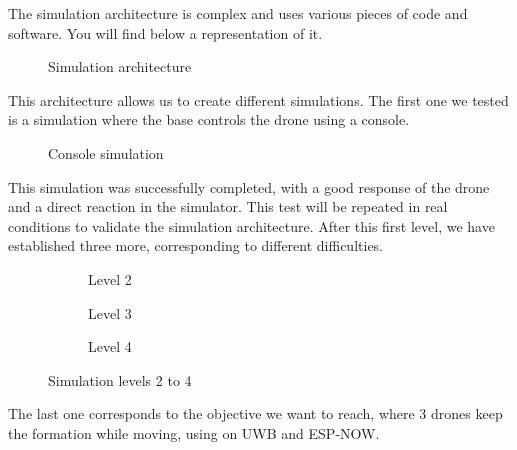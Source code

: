 \documentclass[conference]{IEEEtran}
\begin{document}
The simulation architecture is complex and uses various pieces of code and
software. You will find below a representation of it.

\begin{figure}[H]
    \centering
    \resizebox{\linewidth}{!}{\SchSimulation}
    \caption{Simulation architecture}
    \label{fig:SchSimulation}
\end{figure}

This architecture allows us to create different simulations. The first one we
tested is a simulation where the base controls the drone using a console.

\begin{figure}[H]
    \centering
    \resizebox{\linewidth}{!}{\LevelUN}
    \caption{Console simulation}
    \label{fig:LevelUN}
\end{figure}

This simulation was successfully completed, with a good response of the drone
and a direct reaction in the simulator. This test will be repeated in real
conditions to validate the simulation architecture. After this first level, we have established three more, corresponding to
different difficulties.

\begin{figure}[H]
    \centering
    \begin{subfigure}{0.48\linewidth}
        \centering
        \resizebox{\linewidth}{!}{\LevelDeux}
        \caption{Level 2}
        \label{fig:LevelDeux}
    \end{subfigure}\hfill
    \begin{subfigure}{0.48\linewidth}
        \centering
        \resizebox{\linewidth}{!}{\LevelTrois}
        \caption{Level 3}
        \label{fig:LevelTrois}
    \end{subfigure}

    \vspace{1em}

    \begin{subfigure}{0.7\linewidth}
        \centering
        \resizebox{\linewidth}{!}{\LevelQuatre}
        \caption{Level 4}
        \label{fig:LevelQuatre}
    \end{subfigure}

    \caption{Simulation levels 2 to 4}
    \label{fig:Levels}
\end{figure}

The last one corresponds to the objective we want to reach, where 3 drones keep
the formation while moving, using on UWB and ESP-NOW.   
\end{document}

